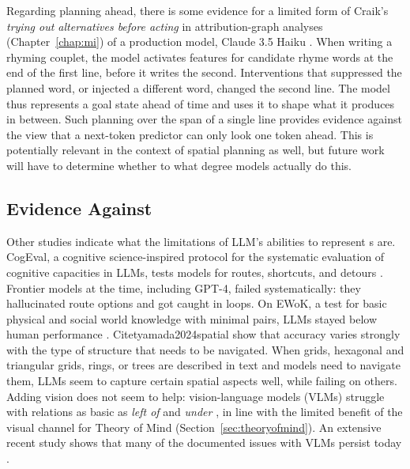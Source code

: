 Regarding planning ahead, there is some evidence for a limited form of Craik's \emph{trying out alternatives before acting} in attribution-graph analyses (Chapter~\ref{chap:mi}) of a production model, Claude 3.5 Haiku \citep{lindsey2025biology}. When writing a rhyming couplet, the model activates features for candidate rhyme words at the end of the first line, before it writes the second. Interventions that suppressed the planned word, or injected a different word, changed the second line. The model thus represents a goal state ahead of time and uses it to shape what it produces in between. Such planning over the span of a single line provides evidence against the view that a next-token predictor can only look one token ahead. This is potentially relevant in the context of spatial planning as well, but future work will have to determine whether to what degree models actually do this.

\subsection{Evidence Against}
Other studies indicate what the limitations of LLM's abilities to represent s are. CogEval, a cognitive science-inspired protocol for the systematic evaluation of cognitive capacities in LLMs, tests models for routes, shortcuts, and detours \citep{momennejad2023cogmap}. Frontier models at the time, including GPT-4, failed systematically: they hallucinated route options and got caught in loops. On EWoK, a test for basic physical and social world knowledge with minimal pairs, LLMs stayed below human performance \citep{ivanova2025elementsworldknowledgeewok}. Citet{yamada2024spatial} show that accuracy varies strongly with the type of structure that needs to be navigated. When grids, hexagonal and triangular grids, rings, or trees are described in text and models need to navigate them, LLMs seem to capture certain spatial aspects well, while failing on others. Adding vision does not seem to help: vision-language models (VLMs) struggle with relations as basic as {\em left of} and {\em under} \citep{kamath2023whats}, in line with the limited benefit of the visual channel for Theory of Mind (Section~\ref{sec:theoryofmind}). An extensive recent study shows that many of the documented issues with VLMs persist today \citep{wang2026monos}.

